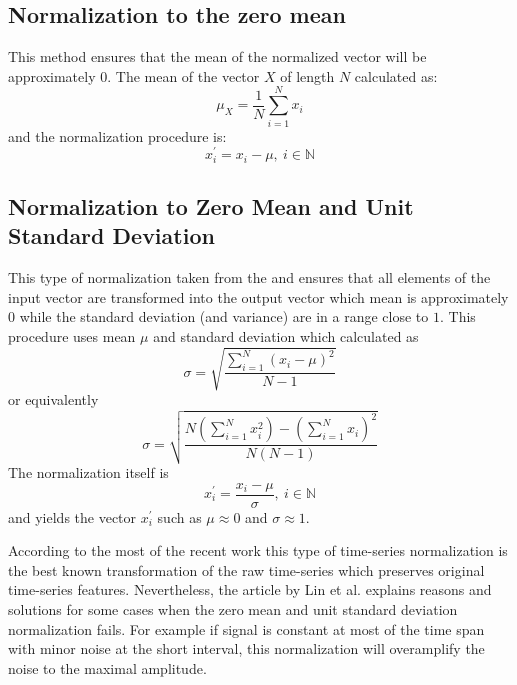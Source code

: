 \subsection{Normalization to the zero mean}
This method ensures that the mean of the normalized vector will be approximately $0$. The mean of the vector $X$ of length $N$ calculated as:
\[
\mu_{X} = \frac{1}{N}\sum_{i=1}^{N}x_{i}
\]
and the normalization procedure is:
\[
x_{i}^{'} = x_{i} - \mu, \: i \in \mathbb{N}
\]

\subsection{Normalization to Zero Mean and Unit Standard Deviation} \label{sect:normalization}
This type of normalization taken from the \cite{citeulike:3815880} and ensures that all elements of the input vector are transformed into the output vector which mean is approximately $0$ while the standard deviation (and variance) are in a range close to $1$.
This procedure uses mean $\mu$ and standard deviation which calculated as 
\[
\sigma = \sqrt{ \frac{ \sum_{i=1}^{N} (x_{i} - \mu)^{2} }{ N - 1 } }
\]
or equivalently
\[
\sigma = \sqrt{ \frac{
                  N \left( \sum_{i=1}^{N} x_{i}^{2}  \right) - 
                  \left( \sum_{i=1}^{N} x_{i} \right) ^{2}
                }{
                  N(N-1)
                }  
          }
\]
The normalization itself is 
\begin{equation}
x_{i}^{'} = \frac{x_{i} - \mu}{\sigma}, \: i \in \mathbb{N}
\end{equation}
and yields the vector $x_{i}^{'}$ such as $\mu \approx 0$ and $\sigma \approx 1$.

According to the most of the recent work \cite{citeulike:3815880} \cite{citeulike:2821475} \cite{citeulike:3978002} this type of time-series normalization is the best known transformation of the raw time-series which preserves original time-series features. Nevertheless, the article by Lin et al. \cite{citeulike:2821475} explains reasons and solutions for some cases when the zero mean and unit standard deviation normalization fails. For example if signal is constant at most of the time span with minor noise at the short interval, this normalization will overamplify the noise to the maximal amplitude.